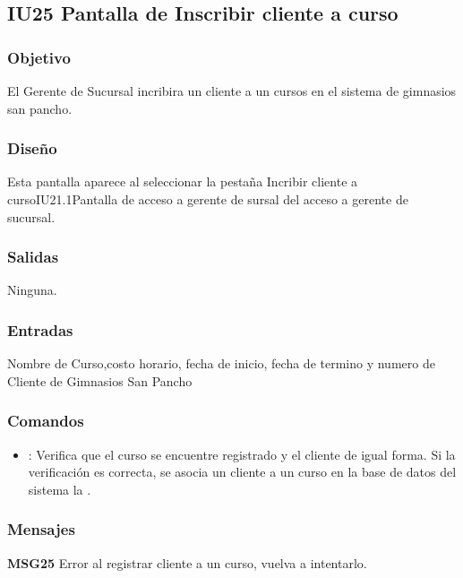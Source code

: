 \subsection{IU25 Pantalla de Inscribir cliente a curso}



\subsubsection{Objetivo}
	El Gerente de Sucursal incribira un cliente a un cursos en el sistema de gimnasios san pancho.

\subsubsection{Diseño}
Esta pantalla aparece al seleccionar la pestaña Incribir cliente a curso{IU21.1}{Pantalla de acceso a gerente de sursal} del acceso a gerente de sucursal. 


\subsubsection{Salidas}

	Ninguna.

\subsubsection{Entradas}
Nombre de Curso,costo horario, fecha de inicio, fecha de termino y numero de Cliente de Gimnasios San Pancho

\subsubsection{Comandos}
\begin{itemize}
	\item {}: Verifica que el curso se encuentre registrado y el cliente de igual forma. Si la verificación es correcta, se asocia un cliente a un curso en la base de datos del sistema la .
\end{itemize}

\subsubsection{Mensajes}
	\begin{Citemize}
		\item {\bf MSG25} Error al registrar cliente a un curso, vuelva a intentarlo.
	\end{Citemize}
